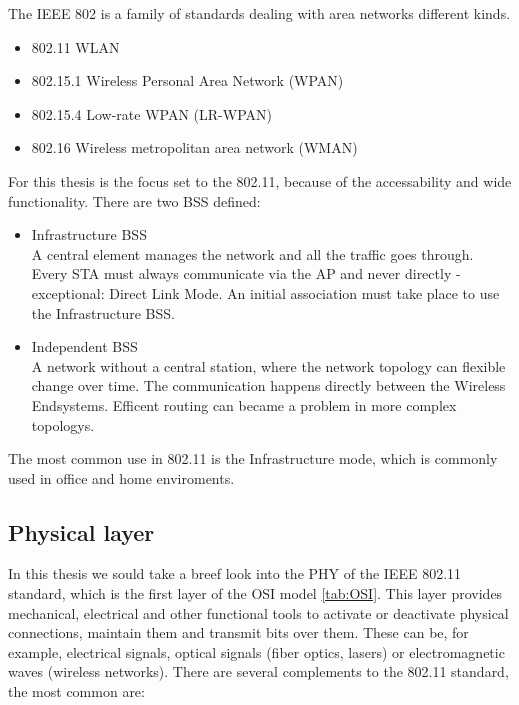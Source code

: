 The \ac{IEEE} 802 is a family of standards dealing with area networks different kinds.
\begin{itemize}
	\item 802.11 \ac{WLAN}
	\item 802.15.1 Wireless Personal Area Network (WPAN)
	\item 802.15.4 Low-rate WPAN (LR-WPAN)
	\item 802.16 Wireless metropolitan area network (WMAN)
\end{itemize}

For this thesis is the focus set to the 802.11, because of the accessability and wide functionality.
There are two \ac{BSS} defined:
\begin{itemize}
	\label{itm:bss}
	\item Infrastructure BSS\\
	A central element manages the network and all the traffic goes through. 
	Every \ac{STA} must always communicate via the \ac{AP} and never directly - exceptional: Direct Link Mode.
	An initial association must take place to use the Infrastructure \ac{BSS}.
	
	\item Independent BSS\\
	A network without a central station, where the network topology can flexible change over time.
	The communication happens directly between the Wireless Endsystems.
	Efficent routing can became a problem in more complex topologys.
\end{itemize}
The most common use in 802.11 is the Infrastructure mode, which is commonly used in office and home enviroments.\\ 

\subsection*{Physical layer}

In this thesis we sould take a breef look into the \ac{PHY} of the IEEE 802.11 standard, which is the first layer of the OSI model \ref{tab:OSI}.
This layer provides mechanical, electrical and other functional tools to activate or deactivate physical connections, maintain them and transmit bits over them. 
These can be, for example, electrical signals, optical signals (fiber optics, lasers) or electromagnetic waves (wireless networks).
There are several complements to the 802.11 standard, the most common are:


